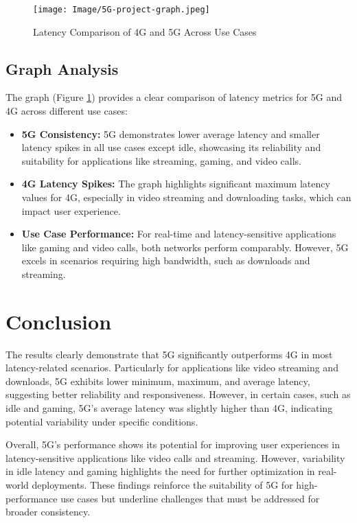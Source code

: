 \documentclass[conference]{IEEEtran}
\begin{document}
\begin{figure}[h]
        \centering
        \texttt{[image: Image/5G-project-graph.jpeg]}
        \caption{Latency Comparison of 4G and 5G Across Use Cases}
        \label{fig:4g_gaming}
    \end{figure}

    \subsection{Graph Analysis}
The graph (Figure \ref{fig:4g_gaming}) provides a clear comparison of latency metrics for 5G and 4G across different use cases:

\begin{itemize}
    \item \textbf{5G Consistency:} 5G demonstrates lower average latency and smaller latency spikes in all use cases except idle, showcasing its reliability and suitability for applications like streaming, gaming, and video calls.
    \item \textbf{4G Latency Spikes:} The graph highlights significant maximum latency values for 4G, especially in video streaming and downloading tasks, which can impact user experience.
    \item \textbf{Use Case Performance:} For real-time and latency-sensitive applications like gaming and video calls, both networks perform comparably. However, 5G excels in scenarios requiring high bandwidth, such as downloads and streaming.
\end{itemize}

\section{Conclusion}

The results clearly demonstrate that 5G significantly outperforms 4G in most latency-related scenarios. Particularly for applications like video streaming and downloads, 5G exhibits lower minimum, maximum, and average latency, suggesting better reliability and responsiveness. However, in certain cases, such as idle and gaming, 5G’s average latency was slightly higher than 4G, indicating potential variability under specific conditions.

Overall, 5G's performance shows its potential for improving user experiences in latency-sensitive applications like video calls and streaming. However, variability in idle latency and gaming highlights the need for further optimization in real-world deployments. These findings reinforce the suitability of 5G for high-performance use cases but underline challenges that must be addressed for broader consistency.
\end{document}
